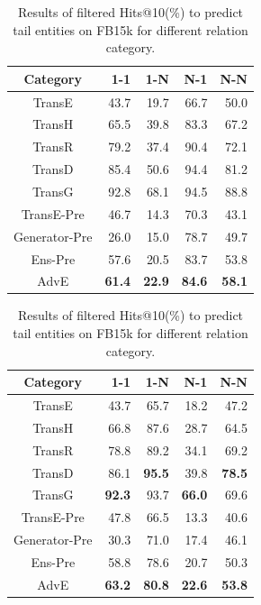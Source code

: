 \documentclass[twocolumn,a4paper,preprint,10pt,3p]{elsarticle}
\begin{document}
\begin{table}[htb]
    \centering
    \parbox[b]{\columnwidth}{
        \centering
        \begin{tabular}{c|r|r|r|r}
            \toprule
            \textbf{Category} & \textbf{1{-}1} & \textbf{1-N} & \textbf{N-1} & \textbf{N-N} \\
            \midrule
            TransE & 43.7 & 19.7 & 66.7 & 50.0 \\
            TransH & 65.5 & 39.8 & 83.3 & 67.2 \\
            TransR & 79.2 & 37.4 & 90.4 & 72.1 \\
            TransD & 85.4 & 50.6 & 94.4 & 81.2 \\
            TransG & 92.8 & 68.1 & 94.5 & 88.8 \\
            \midrule
            TransE-Pre & 46.7 & 14.3 & 70.3 & 43.1 \\        
            Generator-Pre & 26.0 & 15.0 & 78.7 & 49.7 \\
            \midrule
            Ens-Pre & 57.6 & 20.5 & 83.7 & 53.8 \\
            AdvE & \textbf{61.4} & \textbf{22.9} & \textbf{84.6} & \textbf{58.1} \\
            \bottomrule
        \end{tabular}
    }
    
    \parbox[b]{\columnwidth}{
        \centering
        \begin{tabular}{c|r|r|r|r}
            \toprule
            \textbf{Category} & \textbf{1{-}1} & \textbf{1-N} & \textbf{N-1} & \textbf{N-N} \\
            \midrule
            TransE & 43.7 & 65.7 & 18.2 & 47.2 \\
            TransH & 66.8 & 87.6 & 28.7 & 64.5 \\
            TransR & 78.8 & 89.2 & 34.1 & 69.2 \\
            TransD & 86.1 & \textbf{95.5} & 39.8 & \textbf{78.5} \\
            TransG & \textbf{92.3} & 93.7 & \textbf{66.0} & 69.6 \\
            \midrule
            TransE-Pre & 47.8 & 66.5 & 13.3 & 40.6 \\        
            Generator-Pre & 30.3 & 71.0 & 17.4 & 46.1 \\
            \midrule
            Ens-Pre & 58.8 & 78.6 & 20.7 & 50.3 \\
            AdvE & \textbf{63.2} & \textbf{80.8} & \textbf{22.6} & \textbf{53.8} \\
            \bottomrule
        \end{tabular}
    }

    \caption{Results of filtered Hits@10(\%) to predict tail entities on FB15k for different relation category.}
\label{tab:rel-cate-results}
\end{table}
\end{document}
